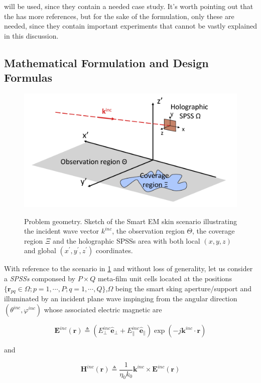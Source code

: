 will be used, since they contain a needed case study. It's worth pointing out that the \cite{Oliveri:2021} has more references, but for the sake of the formulation, only these are needed, since they contain important experiments that cannot be vastly explained in this discussion.
\subsection{Mathematical Formulation and Design Formulas}
\label{sub:Mathematical-And-Design-Formulas}
\begin{figure}[H]
\centering
\includegraphics[scale=0.35]{./Figure/Figure01.png}
\label{cap:Geom}
\caption{\footnotesize Problem geometry. Sketch of the Smart EM skin scenario illustrating the incident wave vector $k^{inc}$, the observation region $\Theta$, the coverage region $\Xi$ and the holographic SPSSs area with both local $(x, y, z)$ and global $(x^{'}, y^{'}, z^{'})$ coordinates.}
\end{figure}
With reference to the scenario in \ref{cap:Geom} and without loss
of generality, let us consider a \emph{SPSSs} componsed by $P\times Q$
meta-film unit cells located at the positions $\{\mathbf{\mathbf{r}}_{pq}\in\Omega;p=1,\cdots,P;q=1,\cdots,Q\}$,$\Omega$
being the smart sking aperture/support and illuminated by an incident
plane wave impinging from the angular direction $(\theta^{inc},\varphi^{inc})$
whose associated electric magnetic are

\begin{equation}
\mathbf{E}^{inc}(\mathbf{r})\triangleq(E_{\perp}^{inc}\mathbf{\hat{e}}_{\perp}+E_{\parallel}^{inc}\mathbf{\hat{e}}_{\parallel})\exp(-j\mathbf{k}^{inc}\cdot\mathbf{r})\label{eq:1}\end{equation}


and

\begin{equation}
\mathbf{H}^{inc}(\mathbf{r})\triangleq\frac{1}{\eta_{0}k_{0}}\mathbf{k}^{inc}\times\mathbf{E}^{inc}(\mathbf{r})\label{eq:2}\end{equation}


